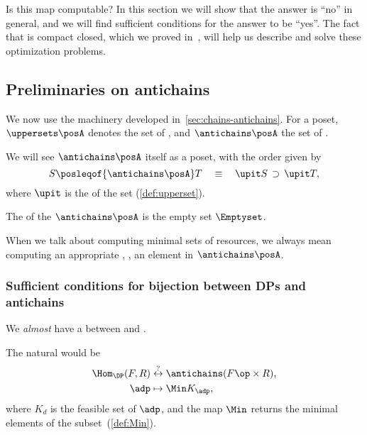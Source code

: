 Is this map computable?
In this section we will show that the answer is ``no'' in general, and we will find sufficient conditions for the answer to be ``yes''.
The fact that \DP is compact closed, which we proved in~\XXX, will help us describe and solve these optimization problems.

\subsection{Preliminaries on antichains}

We now use the  machinery developed in~\cref{sec:chains-antichains}.
For \posA a poset, $\uppersets \posA$ denotes the set of , and $\antichains \posA$ the set of .


We will see $\antichains \posA$ itself as a poset, with the order given by
\begin{equation}
    S \posleqof{\antichains \posA} T  \quad \equiv \quad\upit S\, \supset\,\upit T,
\end{equation}
where $\upit$ is the  of the set (\cref{def:upperset}).

The  of the  $\antichains\posA$ is the empty set $\Emptyset$.

When we talk about computing minimal sets of resources, we always mean computing an appropriate , \ie, an element in $\antichains \posA$.

\subsubsection{Sufficient conditions for bijection between DPs and antichains }

We \emph{almost} have a  between  and .

The natural  would be
\begin{equation}
    \begin{aligned}
        \Hom_\DP(F,R) & \overset{?
        }{\leftrightarrow} \antichains (F\op \times R), \\
        \adp          & \mapsto \Min K_\adp,
    \end{aligned}
\end{equation}
where $K_d$ is the feasible set of $\adp$,
and the map $\Min$ returns the minimal elements of the subset~(\cref{def:Min}).

